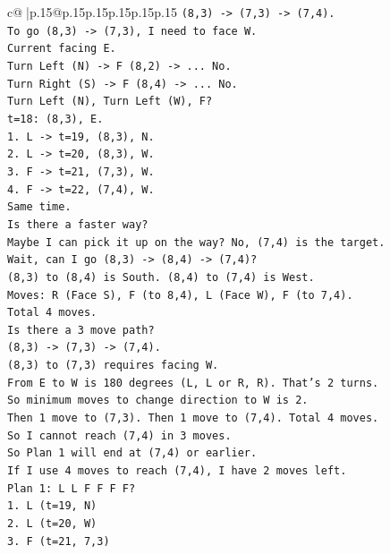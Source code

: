 \documentclass{article}
\begin{document}
{\begin{supertabular}{c@{$\;$}|p{.15\linewidth}@{}p{.15\linewidth}p{.15\linewidth}p{.15\linewidth}p{.15\linewidth}p{.15\linewidth}}
{{{\texttt{(8,3) {-}> (7,3) {-}> (7,4).} \\
\texttt{To go (8,3) {-}> (7,3), I need to face W.} \\
\texttt{Current facing E.} \\
\texttt{Turn Left (N) {-}> F (8,2) {-}> ... No.} \\
\texttt{Turn Right (S) {-}> F (8,4) {-}> ... No.} \\
\texttt{Turn Left (N), Turn Left (W), F?} \\
\texttt{t=18: (8,3), E.} \\
\texttt{1. L {-}> t=19, (8,3), N.} \\
\texttt{2. L {-}> t=20, (8,3), W.} \\
\texttt{3. F {-}> t=21, (7,3), W.} \\
\texttt{4. F {-}> t=22, (7,4), W.} \\
\texttt{Same time.} \\
\texttt{Is there a faster way?} \\
\texttt{Maybe I can pick it up on the way? No, (7,4) is the target.} \\
\texttt{Wait, can I go (8,3) {-}> (8,4) {-}> (7,4)?} \\
\texttt{(8,3) to (8,4) is South. (8,4) to (7,4) is West.} \\
\texttt{Moves: R (Face S), F (to 8,4), L (Face W), F (to 7,4).} \\
\texttt{Total 4 moves.} \\
\texttt{Is there a 3 move path?} \\
\texttt{(8,3) {-}> (7,3) {-}> (7,4).} \\
\texttt{(8,3) to (7,3) requires facing W.} \\
\texttt{From E to W is 180 degrees (L, L or R, R). That's 2 turns.} \\
\texttt{So minimum moves to change direction to W is 2.} \\
\texttt{Then 1 move to (7,3). Then 1 move to (7,4). Total 4 moves.} \\
\texttt{So I cannot reach (7,4) in 3 moves.} \\
\texttt{So Plan 1 will end at (7,4) or earlier.} \\
\texttt{If I use 4 moves to reach (7,4), I have 2 moves left.} \\
\texttt{Plan 1: L L F F F F?} \\
\texttt{1. L (t=19, N)} \\
\texttt{2. L (t=20, W)} \\
\texttt{3. F (t=21, 7,3)} \\
}}}
\end{supertabular}}
\end{document}
